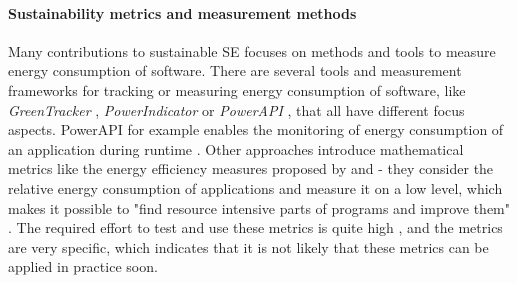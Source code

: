 \documentclass[oribibl]{llncs}
\begin{document}
\paragraph{Sustainability metrics and measurement methods} Many contributions to sustainable SE focuses on methods and tools to measure energy consumption of software. %
There are several tools and measurement frameworks for tracking or measuring energy consumption of software, like \textit{GreenTracker} \cite{amsel_toward_2011}, \textit{PowerIndicator} \cite{naumann_how_2008} or \textit{PowerAPI} \cite{noureddine_preliminary_2012}, that all have different focus aspects. PowerAPI for example enables the monitoring of energy consumption of an application during runtime \cite{noureddine_preliminary_2012}. %
Other approaches introduce mathematical metrics %
like the energy efficiency measures proposed by \cite{capra_is_2012} and \cite{johann_how_2012} - they consider the relative energy consumption of applications %
and measure it on a low level, which makes it possible to "find resource intensive parts of programs and improve them" \cite{johann_how_2012}. The required effort to test and use these metrics is quite high \cite{johann_how_2012}, and the metrics are very specific, which indicates that it is not likely that these metrics can be applied in practice soon.\\
\end{document}
